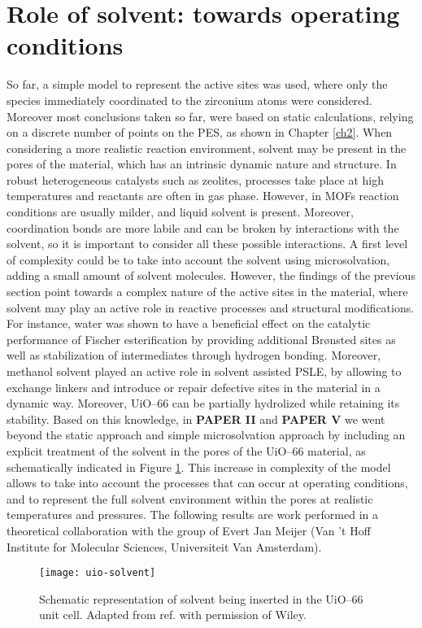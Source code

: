 \section{Role of solvent: towards operating conditions}
So far, a simple model to represent the active sites was used, where only the species immediately coordinated to the zirconium atoms were considered. Moreover most conclusions taken so far, were based on static calculations, relying on a discrete number of points on the PES, as shown in Chapter \ref{ch2}. When considering a more realistic reaction environment, solvent may be present in the pores of the material, which has an intrinsic dynamic nature and structure. In robust heterogeneous catalysts such as zeolites, processes take place at high temperatures and reactants are often in gas phase. However, in MOFs reaction conditions are usually milder, and liquid solvent is present. Moreover, coordination bonds are more labile and can be broken by interactions with the solvent, so it is important to consider all these possible interactions. A first level of complexity could be to take into account the solvent using microsolvation, adding a small amount of solvent molecules. However, the findings of the previous section point towards a complex nature of the active sites in the material, where solvent may play an active role in reactive processes and structural modifications. 
For instance, water was shown to have a beneficial effect on the catalytic performance of Fischer esterification by providing additional Br\o{}nsted sites as well as stabilization of intermediates through hydrogen bonding. Moreover, methanol solvent played an active role in solvent assisted PSLE, by allowing to exchange linkers and introduce or repair defective sites in the material in a dynamic way. Moreover, UiO--66 can be partially hydrolized\cite{decoste2013stability} while retaining its stability.
\npar
Based on this knowledge, in \textbf{PAPER II} and \textbf{PAPER V} we went beyond the static approach and simple microsolvation approach by including an explicit treatment of the solvent in the pores of the UiO--66 material, as schematically indicated in Figure \ref{fig:uio-solvent}. This increase in complexity of the model allows to take into account the processes that can occur at operating conditions, and to represent the full solvent environment within the pores at realistic temperatures and pressures. The following results are work performed in a theoretical collaboration with the group of Evert Jan Meijer (Van 't Hoff Institute for Molecular Sciences, Universiteit Van Amsterdam).
\begin{figure}[!htbp]
	\centering
	\texttt{[image: uio-solvent]}
	\caption{Schematic representation of solvent being inserted in the UiO--66 unit cell. Adapted from ref. \cite{caratelli2018influence} with permission of Wiley.}
	\label{fig:uio-solvent}
\end{figure}


